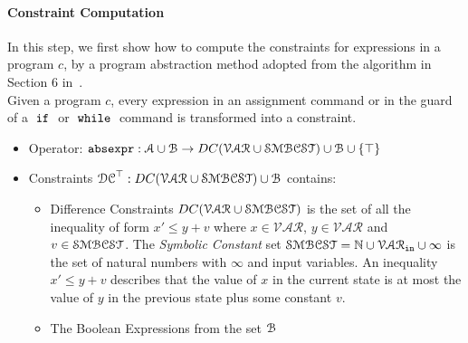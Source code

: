 \paragraph{Constraint Computation}
In this step, we first show how to compute the constraints for expressions in a program $c$,
by a program abstraction method adopted from the
algorithm in Section 6 in~\cite{sinn2017complexity}.
\\
Given a program $c$,
every expression in an assignment command or in the guard of a $\;\mathtt{if}\;$ or $\;\mathtt{while}\;$ command
is transformed into a constraint.

\begin{itemize}
\item Operator: $\mathtt{abs}{\mathtt{expr}} : \mathcal{A} \cup \mathcal{B} \to DC(\mathcal{VAR}  \cup \mathcal{SMBCST})\cup \mathcal{B} \cup \{\top\}$
%
\item Constraints $\mathcal{DC}^{\top}: DC(\mathcal{VAR}  \cup \mathcal{SMBCST}) \cup \mathcal{B}$  contains:
%
\begin{itemize}
\item Difference Constraints $DC(\mathcal{VAR}  \cup \mathcal{SMBCST})$ is the set of all the inequality of
form $x' \leq y + v$ where $x \in \mathcal{VAR} $, 
$y \in \mathcal{VAR}$ and $v \in \mathcal{SMBCST}$.
The \emph{Symbolic Constant} set $\mathcal{SMBCST} = \mathbb{N} \cup \mathcal{VAR}_{\mathtt{in}} \cup{\infty}$
is the set of natural numbers with $\infty$ and input variables.
An inequality $x' \leq y + v$ describes that the value of $x$ in the current state is
at most the value of $y$ in the previous state plus some constant $v$.
%
\item The Boolean Expressions from the set $\mathcal{B}$
%
\end{itemize}
\end{itemize}

